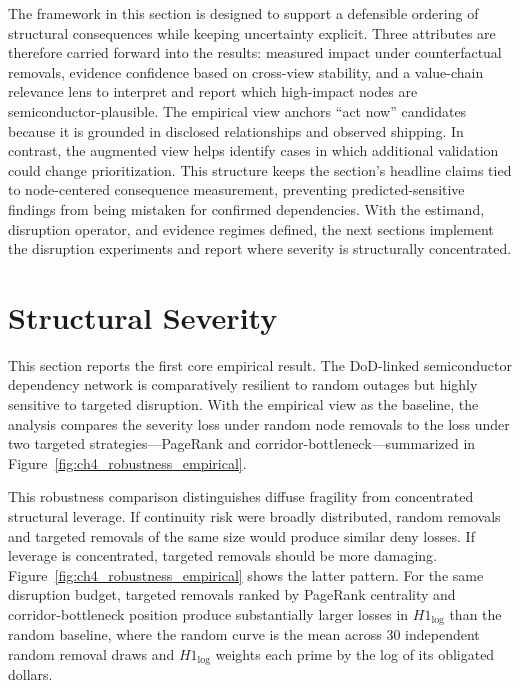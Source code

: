 The framework in this section is designed to support a defensible ordering of structural consequences while keeping uncertainty explicit. Three attributes are therefore carried forward into the results: measured impact under counterfactual removals, evidence confidence based on cross-view stability, and a value-chain relevance lens to interpret and report which high-impact nodes are semiconductor-plausible. The empirical view anchors ``act now'' candidates because it is grounded in disclosed relationships and observed shipping. In contrast, the augmented view helps identify cases in which additional validation could change prioritization. This structure keeps the section's headline claims tied to node-centered consequence measurement, preventing predicted-sensitive findings from being mistaken for confirmed dependencies. With the estimand, disruption operator, and evidence regimes defined, the next sections implement the disruption experiments and report where severity is structurally concentrated.

\section{Structural Severity}
\label{sec:ch4_severity}

This section reports the first core empirical result. The DoD-linked semiconductor dependency network is comparatively resilient to random outages but highly sensitive to targeted disruption. With the empirical view as the baseline, the analysis compares the severity loss under random node removals to the loss under two targeted strategies---PageRank and corridor-bottleneck---summarized in Figure~\ref{fig:ch4_robustness_empirical}.

This robustness comparison distinguishes diffuse fragility from concentrated structural leverage. If continuity risk were broadly distributed, random removals and targeted removals of the same size would produce similar deny losses. If leverage is concentrated, targeted removals should be more damaging. Figure~\ref{fig:ch4_robustness_empirical} shows the latter pattern. For the same disruption budget, targeted removals ranked by PageRank centrality and corridor-bottleneck position produce substantially larger losses in $H1_{\log}$ than the random baseline, where the random curve is the mean across 30 independent random removal draws and $H1_{\log}$ weights each prime by the log of its obligated dollars.


